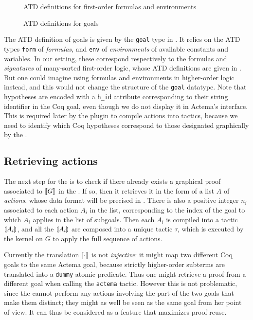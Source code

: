 \begin{figure}
  
  \caption{ATD definitions for first-order formulas and environments}
\end{figure}

\begin{figure}
  
  \caption{ATD definitions for goals}
\end{figure}

The ATD definition of goals is given by the \texttt{goal} type in
. It relies on
the ATD types \texttt{form} of \emph{formulas}, and \texttt{env} of
\emph{environments} of available constants and variables. In our setting, these
correspond respectively to the formulas and \emph{signatures} of many-sorted
first-order logic, whose ATD definitions are given in . But one
could imagine using formulas and environments in higher-order logic instead, and
this would not change the structure of the \texttt{goal} datatype. Note that
hypotheses are encoded with a \texttt{h\_id} attribute corresponding to their
string identifier in the Coq goal, even though we do not display it in Actema's
interface. This is required later by the plugin to compile actions into tactics,
because we need to identify which Coq hypotheses correspond to those designated
graphically by the .

\subsection{Retrieving actions}

The next step for the  is to check if there already exists a
graphical proof associated to $\llbracket G \rrbracket$ in the . If so,
then it retrieves it in the form of a list $A$ of \emph{actions}, whose data
format will be precised in . There is also a positive
integer $n_i$ associated to each action $A_i$ in the list, corresponding to the
index of the goal to which $A_i$ applies in the list of subgoals. Then each
$A_i$ is compiled into a tactic $\llparenthesis A_i \rrparenthesis$, and all the $\llparenthesis A_i \rrparenthesis$
are composed into a unique tactic $\tau$, which is executed by the kernel on $G$
to apply the full sequence of actions.

\begin{remark}
  Currently the translation $\llbracket \cdot \rrbracket$ is not \emph{injective}: it might
  map two different Coq goals to the same Actema goal, because strictly
  higher-order subterms are translated into a \texttt{dummy} atomic predicate.
  Thus one might retrieve a proof from a different goal when calling the
  \texttt{actema} tactic. However this is not problematic, since the
   cannot perform any actions involving the part of the two goals
  that make them distinct; they might as well be seen as the same goal from her
  point of view. It can thus be considered as a feature that maximizes proof
  reuse.
\end{remark}

